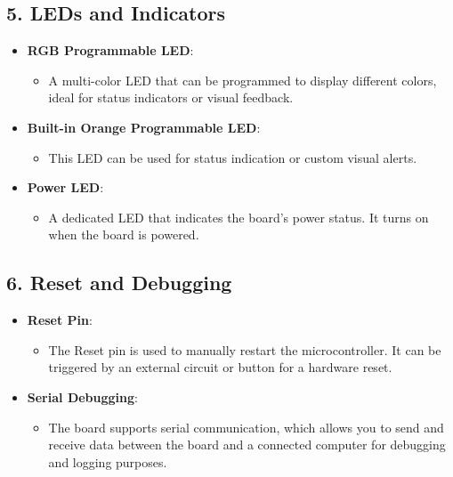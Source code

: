 	\subsection*{5. LEDs and Indicators}
	
	\begin{itemize}
		\item \textbf{RGB Programmable LED}: 
		\begin{itemize}
			\item A multi-color LED that can be programmed to display different colors, ideal for status indicators or visual feedback.
		\end{itemize}
		
		\item \textbf{Built-in Orange Programmable LED}: 
		\begin{itemize}
			\item This LED can be used for status indication or custom visual alerts.
		\end{itemize}
		
		\item \textbf{Power LED}: 
		\begin{itemize}
			\item A dedicated LED that indicates the board's power status. It turns on when the board is powered.
		\end{itemize}
	\end{itemize}
	
	\subsection*{6. Reset and Debugging}
	
	\begin{itemize}
		\item \textbf{Reset Pin}: 
		\begin{itemize}
			\item The Reset pin is used to manually restart the microcontroller. It can be triggered by an external circuit or button for a hardware reset.
		\end{itemize}
		
		\item \textbf{Serial Debugging}: 
		\begin{itemize}
			\item The board supports serial communication, which allows you to send and receive data between the board and a connected computer for debugging and logging purposes.
		\end{itemize}
	\end{itemize}

